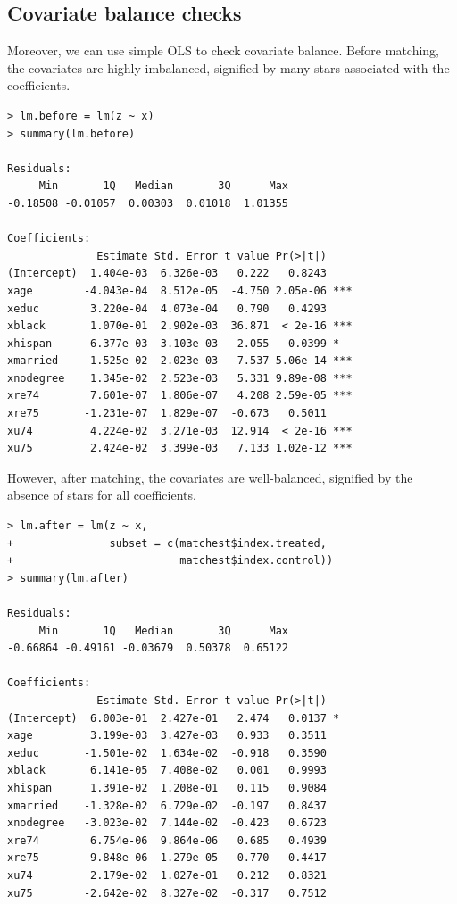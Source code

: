    
   
   \subsection{Covariate balance checks}
   
Moreover, we can use simple OLS to check covariate balance. Before matching, the covariates are highly imbalanced, signified by many stars associated with the coefficients. 
  \begin{lstlisting}
> lm.before = lm(z ~ x)
> summary(lm.before) 

Residuals:
     Min       1Q   Median       3Q      Max 
-0.18508 -0.01057  0.00303  0.01018  1.01355 

Coefficients:
              Estimate Std. Error t value Pr(>|t|)    
(Intercept)  1.404e-03  6.326e-03   0.222   0.8243    
xage        -4.043e-04  8.512e-05  -4.750 2.05e-06 ***
xeduc        3.220e-04  4.073e-04   0.790   0.4293    
xblack       1.070e-01  2.902e-03  36.871  < 2e-16 ***
xhispan      6.377e-03  3.103e-03   2.055   0.0399 *  
xmarried    -1.525e-02  2.023e-03  -7.537 5.06e-14 ***
xnodegree    1.345e-02  2.523e-03   5.331 9.89e-08 ***
xre74        7.601e-07  1.806e-07   4.208 2.59e-05 ***
xre75       -1.231e-07  1.829e-07  -0.673   0.5011    
xu74         4.224e-02  3.271e-03  12.914  < 2e-16 ***
xu75         2.424e-02  3.399e-03   7.133 1.02e-12 *** 
      \end{lstlisting} 
      
      
      However, after matching, the covariates are well-balanced, signified by the absence of stars for all coefficients. 
      
      
   \begin{lstlisting}
> lm.after = lm(z ~ x, 
+               subset = c(matchest$index.treated, 
+                          matchest$index.control))
> summary(lm.after) 

Residuals:
     Min       1Q   Median       3Q      Max 
-0.66864 -0.49161 -0.03679  0.50378  0.65122 

Coefficients:
              Estimate Std. Error t value Pr(>|t|)  
(Intercept)  6.003e-01  2.427e-01   2.474   0.0137 *
xage         3.199e-03  3.427e-03   0.933   0.3511  
xeduc       -1.501e-02  1.634e-02  -0.918   0.3590  
xblack       6.141e-05  7.408e-02   0.001   0.9993  
xhispan      1.391e-02  1.208e-01   0.115   0.9084  
xmarried    -1.328e-02  6.729e-02  -0.197   0.8437  
xnodegree   -3.023e-02  7.144e-02  -0.423   0.6723  
xre74        6.754e-06  9.864e-06   0.685   0.4939  
xre75       -9.848e-06  1.279e-05  -0.770   0.4417  
xu74         2.179e-02  1.027e-01   0.212   0.8321  
xu75        -2.642e-02  8.327e-02  -0.317   0.7512
         \end{lstlisting} 
         
